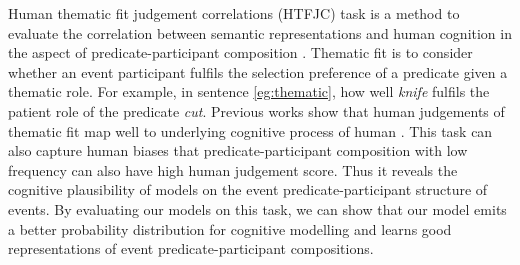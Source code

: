\documentclass[a4paper]{article}
\begin{document}
Human thematic fit judgement correlations (HTFJC) task is a method to evaluate the correlation between semantic representations and human cognition in the aspect of predicate-participant composition \citep{sayeed2016thematic}. Thematic fit is to consider whether an event participant fulfils the selection preference of a predicate given a thematic role. For example, in sentence \ref{eg:thematic}, how well \textit{knife} fulfils the patient role of the predicate \textit{cut}. Previous works show that human judgements of thematic fit map well to underlying cognitive process of human \citep{pado2009probabilistic,vandekerckhove2009robust}. This task can also capture human biases that predicate-participant composition with low frequency can also have high human judgement score. Thus it reveals the cognitive plausibility of models on the event predicate-participant structure of events. By evaluating our models on this task, we can show that our model emits a better probability distribution for cognitive modelling and learns good representations of event predicate-participant compositions. 
\end{document}
